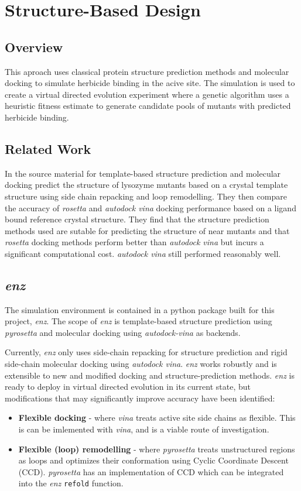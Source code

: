 \documentclass{article}
\begin{document}
\section{Structure-Based Design}
\subsection{Overview}
This aproach uses classical protein structure prediction methods and molecular docking to simulate herbicide binding in the acive site. The simulation is used to create a virtual directed evolution experiment where a genetic algorithm uses a heuristic fitness estimate to generate candidate pools of mutants with predicted herbicide binding.  %
\par
\subsection{Related Work} %
In the source material for template-based structure prediction and molecular docking \textcite{rosettadock} predict the structure of lysozyme mutants based on a crystal template structure using side chain repacking and loop remodelling. They then compare the accuracy of \textit{rosetta} and \textit{autodock vina} docking performance based on a ligand bound reference crystal structure. They find that the structure prediction methods used are sutable for predicting the structure of near mutants and that \textit{rosetta} docking methods perform better than \textit{autodock vina} but incurs a significant computational cost. \textit{autodock vina} still performed reasonably well.  %

\subsection{\textit{enz}} %
The simulation environment is contained in a python package built for this project, \textit{enz}. The scope of \textit{enz} is template-based structure prediction using \textit{pyrosetta} and molecular docking using \textit{autodock-vina} as backends. %
\par
Currently, \textit{enz} only uses side-chain repacking for structure prediction and rigid side-chain molecular docking using \textit{autodock vina}. \textit{enz} works robustly and is extensible to new and modified docking and structure-prediction methods. %
\textit{enz} is ready to deploy in virtual directed evolution in its current state, but modifications that may significantly improve accuracy have been identified:%
\begin{itemize} %
	\item \textbf{Flexible docking} - where \textit{vina} treats active site side chains as flexible. This is can be imlemented with \textit{vina}, and is a viable route of investigation. 
	\item \textbf{Flexible (loop) remodelling} - where \textit{pyrosetta} treats unstructured regions as loops and optimizes their conformation using Cyclic Coordinate Descent (CCD). \textit{pyrosetta} has an implementation of CCD which can be integrated into the \textit{enz} \texttt{refold} function.
\end{itemize}
\end{document}
